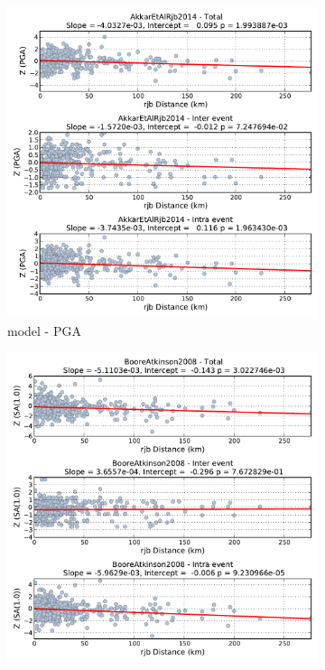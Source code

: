 \begin{figure}[htb]
\begin{subfigure}[b]{0.49\textwidth}
      \includegraphics[width=\textwidth]{./figures/residuals/Akkar2014_Distance_PGA.pdf}
      \caption{\textcite{Akkar_etal2014} model - PGA}
      \label{fig:pga_dist_akkar2014}
  \end{subfigure}
    \begin{subfigure}[b]{0.49\textwidth}
      \includegraphics[width=\textwidth]{./figures/residuals/BA2008_Distance_Sa1.pdf}

\end{subfigure}
\end{figure}
